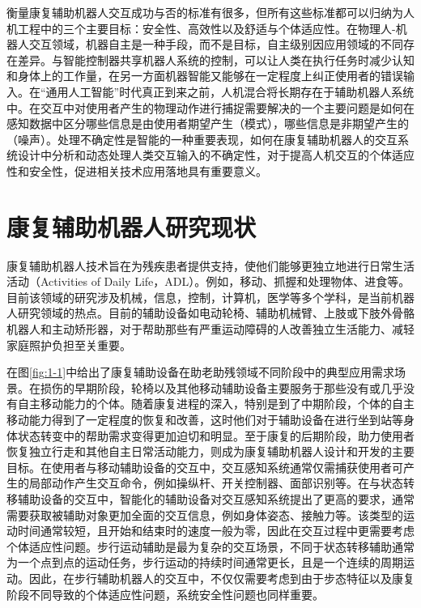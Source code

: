 衡量康复辅助机器人交互成功与否的标准有很多，但所有这些标准都可以归纳为人机工程中的三个主要目标：安全性、高效性以及舒适与个体适应性\cite{leeDesigningPeopleIntroduction2017}。在物理人-机器人交互领域，机器自主是一种手段，而不是目标，自主级别因应用领域的不同存在差异。与智能控制器共享机器人系统的控制，可以让人类在执行任务时减少认知和身体上的工作量，在另一方面机器智能又能够在一定程度上纠正使用者的错误输入。在``通用人工智能''时代真正到来之前，人机混合将长期存在于辅助机器人系统中\cite{ZhangMianXiangRenJiXuGuanJueCeDeHunHeZhiNengFangFaYanJiu2021}。在交互中对使用者产生的物理动作进行捕捉需要解决的一个主要问题是如何在感知数据中区分哪些信息是由使用者期望产生（模式），哪些信息是非期望产生的（噪声）。处理不确定性是智能的一种重要表现，如何在康复辅助机器人的交互系统设计中分析和动态处理人类交互输入的不确定性，对于提高人机交互的个体适应性和安全性，促进相关技术应用落地具有重要意义。

\section{康复辅助机器人研究现状}
康复辅助机器人技术旨在为残疾患者提供支持，使他们能够更独立地进行日常生活活动（Activities of Daily Life，ADL）。例如，移动、抓握和处理物体、进食等。目前该领域的研究涉及机械，信息，控制，计算机，医学等多个学科，是当前机器人研究领域的热点。目前的辅助设备如电动轮椅、辅助机械臂、上肢或下肢外骨骼机器人和主动矫形器，对于帮助那些有严重运动障碍的人改善独立生活能力、减轻家庭照护负担至关重要。

在图\ref{fig:1-1}中给出了康复辅助设备在助老助残领域不同阶段中的典型应用需求场景。在损伤的早期阶段，轮椅以及其他移动辅助设备主要服务于那些没有或几乎没有自主移动能力的个体。随着康复进程的深入，特别是到了中期阶段，个体的自主移动能力得到了一定程度的恢复和改善，这时他们对于辅助设备在进行坐到站等身体状态转变中的帮助需求变得更加迫切和明显。至于康复的后期阶段，助力使用者恢复独立行走和其他自主日常活动能力，则成为康复辅助机器人设计和开发的主要目标。在使用者与移动辅助设备的交互中，交互感知系统通常仅需捕获使用者可产生的局部动作产生交互命令，例如操纵杆、开关控制器、面部识别等。在与状态转移辅助设备的交互中，智能化的辅助设备对交互感知系统提出了更高的要求，通常需要获取被辅助对象更加全面的交互信息，例如身体姿态、接触力等。该类型的运动时间通常较短，且开始和结束时的速度一般为零，因此在交互过程中更需要考虑个体适应性问题。步行运动辅助是最为复杂的交互场景，不同于状态转移辅助通常为一个点到点的运动任务，步行运动的持续时间通常更长，且是一个连续的周期运动。因此，在步行辅助机器人的交互中，不仅仅需要考虑到由于步态特征以及康复阶段不同导致的个体适应性问题，系统安全性问题也同样重要。

